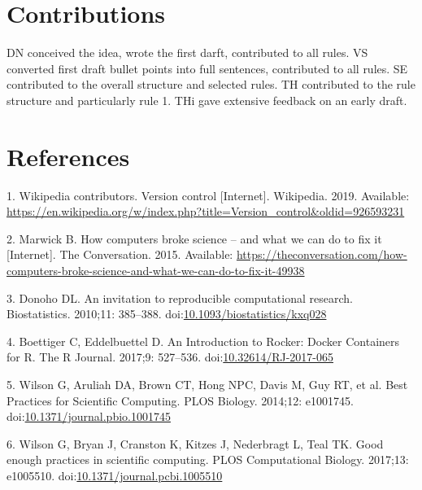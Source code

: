 \documentclass[10pt,letterpaper]{article}
\begin{document}
\hypertarget{contributions}{%
\section*{Contributions}\label{contributions}}

DN conceived the idea, wrote the first darft, contributed to all rules.
VS converted first draft bullet points into full sentences, contributed
to all rules. SE contributed to the overall structure and selected
rules. TH contributed to the rule structure and particularly rule 1. THi
gave extensive feedback on an early draft.

\hypertarget{references}{%
\section*{References}\label{references}}

\hypertarget{refs}{}
\leavevmode\hypertarget{ref-wikipedia_contributors_version_2019}{}%
1. Wikipedia contributors. Version control {[}Internet{]}. Wikipedia.
2019. Available:
\url{https://en.wikipedia.org/w/index.php?title=Version_control\&oldid=926593231}

\leavevmode\hypertarget{ref-marwick_how_2015}{}%
2. Marwick B. How computers broke science -- and what we can do to fix
it {[}Internet{]}. The Conversation. 2015. Available:
\url{https://theconversation.com/how-computers-broke-science-and-what-we-can-do-to-fix-it-49938}

\leavevmode\hypertarget{ref-donoho_invitation_2010}{}%
3. Donoho DL. An invitation to reproducible computational research.
Biostatistics. 2010;11: 385--388.
doi:\href{https://doi.org/10.1093/biostatistics/kxq028}{10.1093/biostatistics/kxq028}

\leavevmode\hypertarget{ref-boettiger_introduction_2017}{}%
4. Boettiger C, Eddelbuettel D. An Introduction to Rocker: Docker
Containers for R. The R Journal. 2017;9: 527--536.
doi:\href{https://doi.org/10.32614/RJ-2017-065}{10.32614/RJ-2017-065}

\leavevmode\hypertarget{ref-wilson_best_2014}{}%
5. Wilson G, Aruliah DA, Brown CT, Hong NPC, Davis M, Guy RT, et al.
Best Practices for Scientific Computing. PLOS Biology. 2014;12:
e1001745.
doi:\href{https://doi.org/10.1371/journal.pbio.1001745}{10.1371/journal.pbio.1001745}

\leavevmode\hypertarget{ref-wilson_good_2017}{}%
6. Wilson G, Bryan J, Cranston K, Kitzes J, Nederbragt L, Teal TK. Good
enough practices in scientific computing. PLOS Computational Biology.
2017;13: e1005510.
doi:\href{https://doi.org/10.1371/journal.pcbi.1005510}{10.1371/journal.pcbi.1005510}
\end{document}
